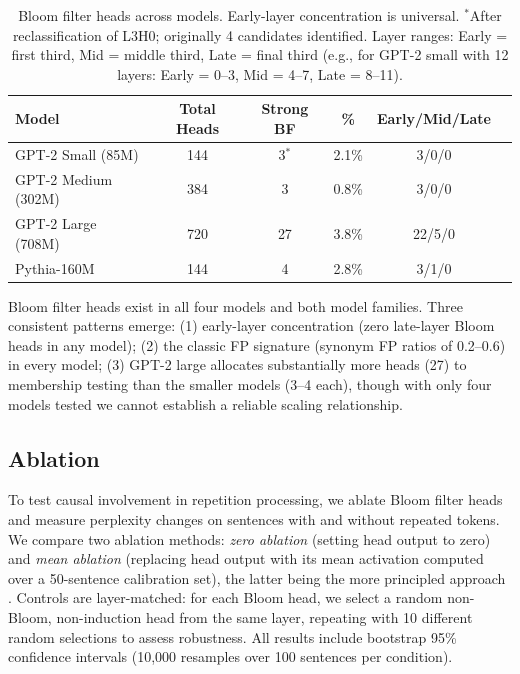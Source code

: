\documentclass[11pt]{article}
\begin{document}
\begin{table}[h]
\centering
\caption{Bloom filter heads across models. Early-layer concentration is universal. $^*$After reclassification of L3H0; originally 4 candidates identified. Layer ranges: Early = first third, Mid = middle third, Late = final third (e.g., for GPT-2 small with 12 layers: Early = 0--3, Mid = 4--7, Late = 8--11).}
\label{tab:crossmodel}
\begin{tabular}{lccccc}
\toprule
Model & Total Heads & Strong BF & \% & Early/Mid/Late \\
\midrule
GPT-2 Small (85M) & 144 & 3$^*$ & 2.1\% & 3/0/0 \\
GPT-2 Medium (302M) & 384 & 3 & 0.8\% & 3/0/0 \\
GPT-2 Large (708M) & 720 & 27 & 3.8\% & 22/5/0 \\
Pythia-160M & 144 & 4 & 2.8\% & 3/1/0 \\
\bottomrule
\end{tabular}
\end{table}

Bloom filter heads exist in all four models and both model families. Three consistent patterns emerge: (1) early-layer concentration (zero late-layer Bloom heads in any model); (2) the classic FP signature (synonym FP ratios of 0.2--0.6) in every model; (3) GPT-2 large allocates substantially more heads (27) to membership testing than the smaller models (3--4 each), though with only four models tested we cannot establish a reliable scaling relationship.

\subsection{Ablation}
\label{sec:ablation}

To test causal involvement in repetition processing, we ablate Bloom filter heads and measure perplexity changes on sentences with and without repeated tokens. We compare two ablation methods: \emph{zero ablation} (setting head output to zero) and \emph{mean ablation} (replacing head output with its mean activation computed over a 50-sentence calibration set), the latter being the more principled approach \citep{wang2022interpretability}. Controls are layer-matched: for each Bloom head, we select a random non-Bloom, non-induction head from the same layer, repeating with 10 different random selections to assess robustness. All results include bootstrap 95\% confidence intervals (10,000 resamples over 100 sentences per condition).
\end{document}
